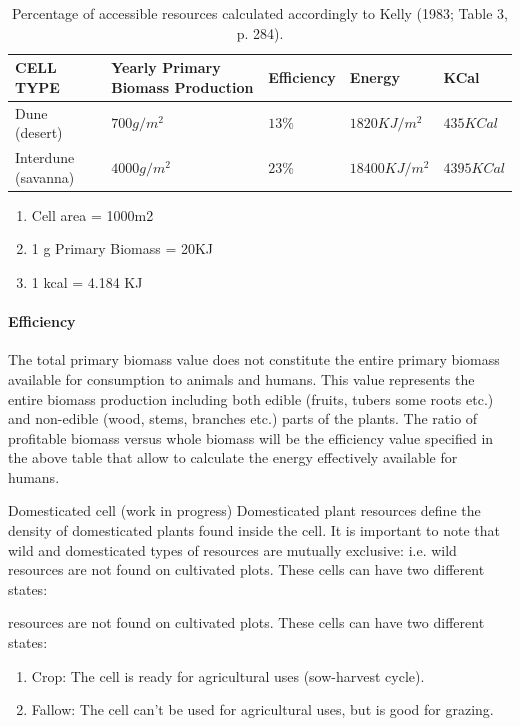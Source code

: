 \begin{table}[ht!]
\centering	
	\begin{tabular}[c]{|l|l|l|l|l|}
	\hline
	CELL TYPE & Yearly Primary Biomass Production & Efficiency & Energy & KCal \\
	\hline
	Dune (desert) & $700g/m^2$ & $13\%$ & $1820KJ/m^2$ & $435KCal$ \\ 
	\hline
	Interdune (savanna) & $4000g/m^2$ & $23\%$ & $18400KJ/m^2$ & $4395KCal$ \\
	\hline
	\end{tabular}
	\caption{Percentage of accessible resources calculated accordingly to Kelly (1983; Table 3, p. 284).}
	\label{tab:tabResources}
\end{table}

\begin{enumerate}
 \item Cell area = 1000m2
 \item 1 g Primary Biomass = 20KJ
 \item 1 kcal = 4.184 KJ
\end{enumerate}


\paragraph{Efficiency}
The total primary biomass value does not constitute the entire primary biomass available for
consumption to animals and humans. This value represents the entire biomass production
including both edible (fruits, tubers some roots etc.) and non-edible (wood, stems, branches
etc.) parts of the plants. The ratio of profitable biomass versus whole biomass will be the
efficiency value specified in the above table that allow to calculate the energy effectively
available for humans.


Domesticated cell (work in progress)
Domesticated plant resources define the density of domesticated plants found inside the cell. It is
important to note that wild and domesticated types of resources are mutually exclusive: i.e. wild
resources are not found on cultivated plots. These cells can have two different states:


resources are not found on cultivated plots. These cells can have two different states:
\begin{enumerate}
\item Crop: The cell is ready for agricultural uses (sow-harvest cycle).
\item Fallow: The cell can't be used for agricultural uses, but is good for grazing.
\end{enumerate}

